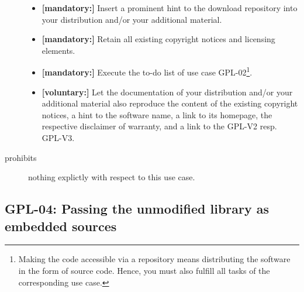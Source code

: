 \begin{description}
\begin{itemize}
  \item \textbf{[mandatory:]} Insert a prominent hint to the download repository
  into your distribution and/or your additional material.

  \item \textbf{[mandatory:]} Retain all existing copyright notices and
  licensing elements.
    
  \item \textbf{[mandatory:]} Execute the to-do list of use case GPL-02\footnote{
  Making the code accessible via a repository means distributing the software in
  the form of source code. Hence, you must also fulfill all tasks of the
  corresponding use case.}.

  \item \textbf{[voluntary:]} Let the documentation of your distribution and/or
  your additional material also reproduce the content of the existing
  copyright notices, a hint to the software name, a link to its homepage,
  the respective disclaimer of warranty, and a link to the GPL-V2 resp.
  GPL-V3.

\end{itemize}

\item[prohibits] nothing explictly with respect to this use case.

\end{description}

\subsection{GPL-04: Passing the unmodified library as embedded sources}
\label{OSUC-07S-GPL} 

